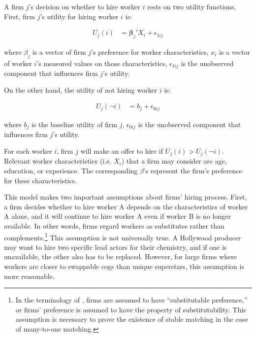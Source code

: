 A firm $j$'s decision on whether to hire worker $i$ rests on two utility
functions. First, firm $j$'s utility for hiring worker $i$ is:

\begin{align}
U_j(i) &= \bm{\beta}_j' X_i + \epsilon_{1ij}
\end{align}

where $\beta_j$ is a vector of firm $j$'s preference for worker characteristics,
$x_i$ is a vector of worker $i$'s measured values on those characteristics, $\epsilon_{1ij}$ is the unobserved component that influences firm $j$'s utility.

On the other hand, the utility of not hiring worker $i$ is:

\begin{align}
U_j(\neg i) &= b_j + \epsilon_{0ij}
\end{align}

where $b_j$ is the baseline utility of firm $j$, $\epsilon_{0ij}$ is the unobserved component that influences firm $j$'s utility.

For each worker $i$, firm $j$ will make an offer to hire if $U_j(i) > U_j(\neg
i)$. Relevant worker characteristics (i.e. $X_i$) that a firm may consider are
age, education, or experience. The corresponding $\beta$'s represent the firm's
preference for these characteristics.

This model makes two important assumptions about firms' hiring process. First, a
firm decides whether to hire worker A depends on the characteristics of worker A
alone, and it will continue to hire worker A even if worker B is no longer available.
In other words, firms regard workers as substitutes rather than
complements.\footnote{In the terminology of \citet{Roth1992}, firms are assumed
  to have ``substitutable preference,'' or firms' preference is assumed to have the property of
  substitutability. This assumption is necessary to prove the existence of stable matching
  in the case of many-to-one matching.} This assumption is not universally true. A
Hollywood producer may want to hire two specific lead actors for their
chemistry, and if one is unavailable, the other also has to be
replaced. However, for large firms where workers are closer to
swappable cogs than unique superstars, this assumption is more reasonable.

